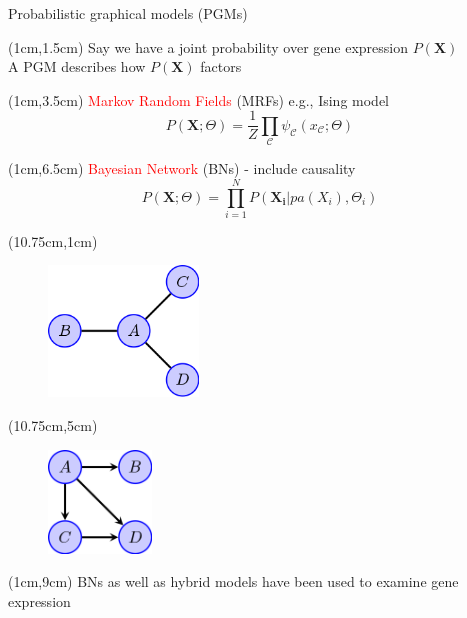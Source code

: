 \documentclass[aspectratio=1610]{beamer}					%
\begin{document}
\begin{frame}{Probabilistic graphical models (PGMs)}

\begin{textblock*}{10cm}(1cm,1.5cm)
Say we have a joint probability over gene expression $P(\bm{X})$\\A PGM describes how $P(\bm{X})$ factors\\
\end{textblock*}

\begin{textblock*}{9cm}(1cm,3.5cm)
\textcolor{red}{Markov Random Fields} (MRFs) e.g., Ising model
\begin{equation*}
P(\bm{X};\Theta) = \frac{1}{Z}\prod_{\mathcal{C}} \psi_{\mathcal{C}}(x_{\mathcal{C}}; \Theta)
\end{equation*}
\end{textblock*}

\begin{textblock*}{7cm}(1cm,6.5cm)
\textcolor{red}{Bayesian Network} (BNs) - include causality
\begin{equation*}
P(\bm{X};\Theta) = \prod_{i=1}^{N}P(\bm{X_{i}}|pa(X_{i}),\Theta_{i})
\end{equation*}
\end{textblock*}


\begin{textblock*}{5cm}(10.75cm,1cm)
\begin{figure}
\includegraphics[width=4cm]{mrf.png}
\end{figure}
\end{textblock*}

\begin{textblock*}{5cm}(10.75cm,5cm)
\begin{figure}
\includegraphics[width=2.75cm]{bayes-net.png}
\end{figure}
\end{textblock*}

\begin{textblock*}{15cm}(1cm,9cm)
BNs as well as hybrid models have been used to examine gene expression
\end{textblock*}

\end{frame}
\end{document}
